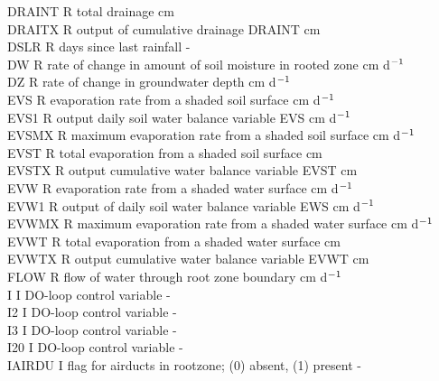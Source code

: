 \documentclass[11pt]{article}
\begin{document}
\begin{tabbing}
DRAINT\> \> R\> total drainage\> \> \> \> \> \> \> cm\\
DRAITX\> \> R\> output of cumulative drainage DRAINT\> \> \> \> \> \> \> cm\\
DSLR\> \> R\> days since last rainfall\> \> \> \> \> \> \> -\\
DW\> \> R\> rate of change in amount of soil moisture in rooted zone\> \> \> \> \> \> \> cm d$^{{\rm -1}}$\\
DZ\> \> R\> rate of change in groundwater depth\> \> \> \> \> \> \> cm d$^{{\rm -1}}$\\
EVS\> \> R\> evaporation rate from a shaded soil surface\> \> \> \> \> \> \> cm d$^{{\rm -1}}$\\
EVS1\> \> R\> output daily soil water balance variable EVS\> \> \> \> \> \> \> cm d$^{{\rm -1}}$\\
EVSMX\> \> R\> maximum evaporation rate from a shaded soil surface\> \> \> \> \> \> \> cm d$^{{\rm -1}}$\\
EVST\> \> R\> total evaporation from a shaded soil surface\> \> \> \> \> \> \> cm\\
EVSTX\> \> R\> output cumulative water balance variable EVST\> \> \> \> \> \> \> cm\\
EVW\> \> R\> evaporation rate from a shaded water surface\> \> \> \> \> \> \> cm d$^{{\rm -1}}$\\
EVW1\> \> R\> output of daily soil water balance variable EWS\> \> \> \> \> \> \> cm d$^{{\rm -1}}$\\
EVWMX\> \> R\> maximum evaporation rate from a shaded water surface\> \> \> \> \> \> \> cm d$^{{\rm -1}}$\\
EVWT\> \> R\> total evaporation from a shaded water surface\> \> \> \> \> \> \> cm\\
EVWTX\> \> R\> output cumulative water balance variable EVWT\> \> \> \> \> \> \> cm\\
FLOW\> \> R\> flow of water through root zone boundary\> \> \> \> \> \> \> cm d$^{{\rm -1}}$\\
I\> \> I\> DO-loop control variable\> \> \> \> \> \> \> -\\
I2\> \> I\> DO-loop control variable\> \> \> \> \> \> \> - \\
I3\> \> I\> DO-loop control variable\> \> \> \> \> \> \> - \\
I20\> \> I\> DO-loop control variable\> \> \> \> \> \> \> - \\
IAIRDU\> \> I\> flag for airducts in rootzone;  (0) absent, (1) present\> \> \> \> \> \> \> -\\

\end{tabbing}
\end{document}
